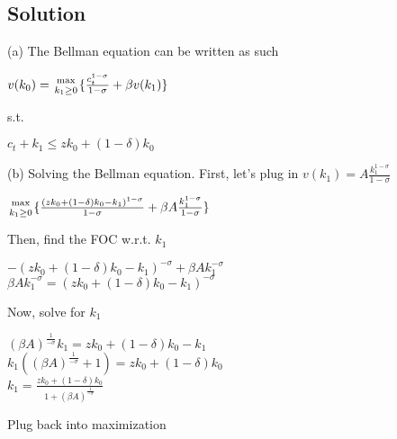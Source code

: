 \documentclass[10pt, a4paper]{article}
\begin{document}
  \subsection*{Solution}
    (a) The Bellman equation can be written as such
    \begin{center}
      $v(k_0)={\max\atop{k_1\geq0}}\{\frac{c_t^{1-\sigma}}{1-\sigma}+\beta v(k_1)\}$ \\
    \end{center}
    s.t.
    \begin{center}
      $c_t + k_1 \leq zk_0+(1-\delta)k_0$ \\
    \end{center}
    (b) Solving the Bellman equation. First, let's plug in $v(k_1) = A\frac{k_1^{1-\sigma}}{1-\sigma}$
    \begin{center}
      ${\max\atop{k_1\geq0}}\{\frac{(zk_0+(1-\delta)k_0-k_1)^{1-\sigma}}{1-\sigma}+\beta A\frac{k_1^{1-\sigma}}{1-\sigma}\}$ \\
    \end{center}
    Then, find the FOC w.r.t. $k_1$
    \begin{center}
      $-(zk_0+(1-\delta)k_0-k_1)^{-\sigma}+\beta Ak_1^{-\sigma}$ \\
      $\beta Ak_1^{-\sigma}=(zk_0+(1-\delta)k_0-k_1)^{-\sigma}$ \\ 
    \end{center}
    Now, solve for $k_1$
    \begin{center}
      $(\beta A)^{\frac{1}{-\sigma}}k_1 = zk_0+(1-\delta)k_0-k_1$ \\
      $k_1((\beta A)^{\frac{1}{-\sigma}}+1)=zk_0+(1-\delta)k_0$ \\
      $k_1 = \frac{zk_0+(1-\delta)k_0}{1+(\beta A)^{\frac{1}{-\sigma}}}$ \\
    \end{center}
    Plug back into maximization
\end{document}
